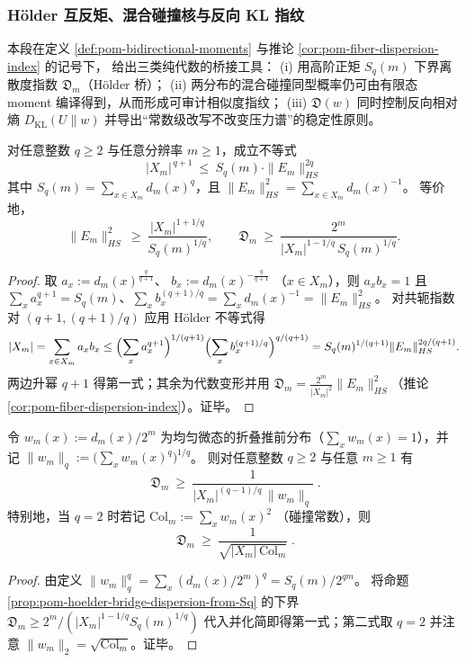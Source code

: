 \subsubsection{Hölder 互反矩、混合碰撞核与反向 KL 指纹}\label{subsubsec:pom-hoelder-mixed-kl-bridge}
本段在定义 \ref{def:pom-bidirectional-moments} 与推论 \ref{cor:pom-fiber-dispersion-index} 的记号下，
给出三类纯代数的桥接工具：
(i) 用高阶正矩 \(S_q(m)\) 下界离散度指数 \(\mathfrak{D}_m\)（Hölder 桥）；
(ii) 两分布的混合碰撞同型概率仍可由有限态 moment 编译得到，从而形成可审计相似度指纹；
(iii) \(\mathfrak{D}(w)\) 同时控制反向相对熵 \(D_{\mathrm{KL}}(U\|w)\) 并导出“常数级改写不改变压力谱”的稳定性原则。

\begin{proposition}\label{prop:pom-hoelder-bridge-dispersion-from-Sq}
对任意整数 \(q\ge 2\) 与任意分辨率 \(m\ge 1\)，成立不等式
\[
\boxed{\;
|X_m|^{\,q+1}\ \le\ S_q(m)\cdot \|E_m\|_{HS}^{2q}\;}
\]
其中 \(S_q(m)=\sum_{x\in X_m}d_m(x)^q\)，且 \(\|E_m\|_{HS}^2=\sum_{x\in X_m}d_m(x)^{-1}\)。
等价地，
\[
\|E_m\|_{HS}^2\ \ge\ \frac{|X_m|^{1+1/q}}{S_q(m)^{1/q}},
\qquad
\mathfrak{D}_m\ \ge\ \frac{2^m}{|X_m|^{1-1/q}\,S_q(m)^{1/q}}.
\]
\end{proposition}
\begin{proof}
取
\(
a_x:=d_m(x)^{\frac{q}{q+1}}
\)、
\(
b_x:=d_m(x)^{-\frac{q}{q+1}}
\)
（\(x\in X_m\)），则 \(a_xb_x=1\) 且
\(
\sum_x a_x^{q+1}=S_q(m)
\)、\(
\sum_x b_x^{(q+1)/q}=\sum_x d_m(x)^{-1}=\|E_m\|_{HS}^2
\)。
对共轭指数对 \((q+1,(q+1)/q)\) 应用 Hölder 不等式得
\[
|X_m|
=\sum_{x\in X_m}a_xb_x
\le
\Bigl(\sum_x a_x^{q+1}\Bigr)^{1/(q+1)}
\Bigl(\sum_x b_x^{(q+1)/q}\Bigr)^{q/(q+1)}
=S_q(m)^{1/(q+1)}\|E_m\|_{HS}^{2q/(q+1)}.
\]
两边升幂 \(q+1\) 得第一式；其余为代数变形并用 \(\mathfrak{D}_m=\frac{2^m}{|X_m|^2}\|E_m\|_{HS}^2\)（推论 \ref{cor:pom-fiber-dispersion-index}）。证毕。
\end{proof}

\begin{corollary}[输出分布的 \(L^q\) 口径]\label{cor:pom-dispersion-lq-lower-bound}
令 \(w_m(x):=d_m(x)/2^m\) 为均匀微态的折叠推前分布（\(\sum_x w_m(x)=1\)），并记
\(
\|w_m\|_q:=\bigl(\sum_x w_m(x)^q\bigr)^{1/q}
\)。
则对任意整数 \(q\ge 2\) 与任意 \(m\ge 1\) 有
\[
\boxed{\;
\mathfrak{D}_m\ \ge\ \frac{1}{|X_m|^{(q-1)/q}\,\|w_m\|_q}\; }.
\]
特别地，当 \(q=2\) 时若记
\(
\mathrm{Col}_m:=\sum_x w_m(x)^2
\)
（碰撞常数），则
\[
\boxed{\;
\mathfrak{D}_m\ \ge\ \frac{1}{\sqrt{|X_m|\,\mathrm{Col}_m}}\; }.
\]
\end{corollary}
\begin{proof}
由定义 \(\|w_m\|_q^q=\sum_x (d_m(x)/2^m)^q=S_q(m)/2^{qm}\)。
将命题 \ref{prop:pom-hoelder-bridge-dispersion-from-Sq} 的下界
\(
\mathfrak{D}_m \ge 2^m/(|X_m|^{1-1/q}S_q(m)^{1/q})
\)
代入并化简即得第一式；第二式取 \(q=2\) 并注意 \(\|w_m\|_2=\sqrt{\mathrm{Col}_m}\)。证毕。
\end{proof}

